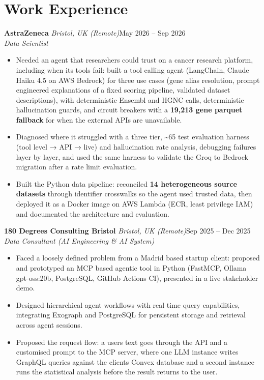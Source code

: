 \documentclass[a4paper,11pt]{article}
\newcommand{\role}[4]{%
  \textbf{#1}{\color{muted}\,\textperiodcentered\,\textit{#2}}\hfill{\color{muted}#3}\\
  \textit{#4}\par}
\newcommand{\gap}{\vspace{5pt}}
\newcommand{\num}[1]{\textbf{#1}}   %
\begin{document}
\section{Work Experience}
\role{AstraZeneca}{Bristol, UK (Remote)}{May 2026 – Sep 2026}{Data Scientist}
\begin{itemize}
  \item Needed an agent that researchers could trust on a cancer research platform, including when its tools fail: built a tool calling agent (LangChain, Claude Haiku 4.5 on AWS Bedrock) for three use cases (gene alias resolution, prompt engineered explanations of a fixed scoring pipeline, validated dataset descriptions), with deterministic Ensembl and HGNC calls, deterministic hallucination guards, and circuit breakers with a \num{19,213 gene parquet fallback} for when the external APIs are unavailable.
  \item Diagnosed where it struggled with a three tier, \textasciitilde{}65 test evaluation harness (tool level → API → live) and hallucination rate analysis, debugging failures layer by layer, and used the same harness to validate the Groq to Bedrock migration after a rate limit evaluation.
  \item Built the Python data pipeline: reconciled \num{14 heterogeneous source datasets} through identifier crosswalks so the agent used trusted data, then deployed it as a Docker image on AWS Lambda (ECR, least privilege IAM) and documented the architecture and evaluation.
\end{itemize}
\gap
{}
\role{180 Degrees Consulting Bristol}{Bristol, UK (Remote)}{Sep 2025 – Dec 2025}{Data Consultant (AI Engineering \& AI System)}
\begin{itemize}
  \item Faced a loosely defined problem from a Madrid based startup client: proposed and prototyped an MCP based agentic tool in Python (FastMCP, Ollama gpt-oss:20b, PostgreSQL, GitHub Actions CI), presented in a live stakeholder demo.
  \item Designed hierarchical agent workflows with real time query capabilities, integrating Exograph and PostgreSQL for persistent storage and retrieval across agent sessions.
  \item Proposed the request flow: a user\textquotesingle{}s text goes through the API and a customised prompt to the MCP server, where one LLM instance writes GraphQL queries against the client\textquotesingle{}s Convex database and a second instance runs the statistical analysis before the result returns to the user.
\end{itemize}
\end{document}
